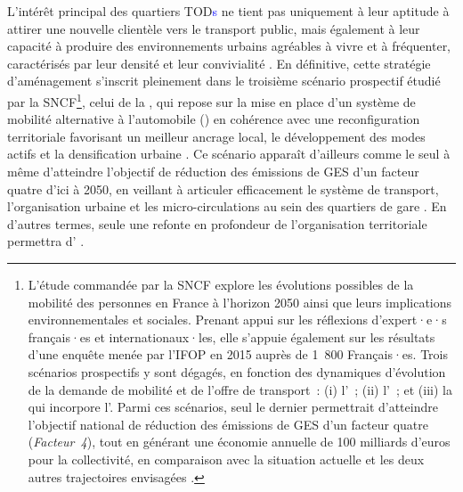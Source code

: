 \begin{refsegment}
L’intérêt principal des quartiers \acrshort{TOD}\textcolor{blue}{s} ne tient pas uniquement à leur aptitude à attirer une nouvelle clientèle vers le transport public, mais également à leur capacité à produire des environnements urbains agréables à vivre et à fréquenter, caractérisés par leur densité et leur convivialité \textcolor{blue}{\autocite[40]{bentayou_transit-oriented_2015}}. En définitive, cette stratégie d’aménagement s’inscrit pleinement dans le troisième scénario prospectif étudié par la SNCF\footnote{
    L’étude commandée par la SNCF explore les évolutions possibles de la mobilité des personnes en France à l’horizon 2050 ainsi que leurs implications environnementales et sociales. Prenant appui sur les réflexions d’expert·e·s français·es et internationaux·les, elle s’appuie également sur les résultats d’une enquête menée par l’\acrfull{IFOP} en 2015 auprès de 1~800 Français·es. Trois scénarios prospectifs y sont dégagés, en fonction des dynamiques d’évolution de la demande de mobilité et de l’offre de transport~: (i) l'~; (ii) l'~; et (iii) la  qui incorpore l'. Parmi ces scénarios, seul le dernier permettrait d’atteindre l’objectif national de réduction des émissions de \acrfull{GES} d’un facteur quatre (\textsl{Facteur~4}), tout en générant une économie annuelle de 100 milliards d’euros pour la collectivité, en comparaison avec la situation actuelle et les deux autres trajectoires envisagées \textcolor{blue}{\autocite[26-37]{sncf_vers_2015}}.
}, celui de la , qui repose sur la mise en place d’un système de mobilité alternative à l’automobile () en cohérence avec une reconfiguration territoriale favorisant un meilleur ancrage local, le développement des modes actifs et la densification urbaine \textcolor{blue}{\autocite[26-37]{sncf_vers_2015}}. Ce scénario apparaît d’ailleurs comme le seul à même d’atteindre l’objectif de réduction des émissions de \acrfull{GES} d’un facteur quatre d’ici à 2050, en veillant à articuler efficacement le système de transport, l’organisation urbaine et les micro-circulations au sein des quartiers de gare \textcolor{blue}{\autocite[148]{krakovitch_metropolitrain_2019}}. En d’autres termes, seule une refonte en profondeur de l’organisation territoriale permettra d’ \textcolor{blue}{\autocite[184]{ducharme_ville_2021}}.%


\end{refsegment}
